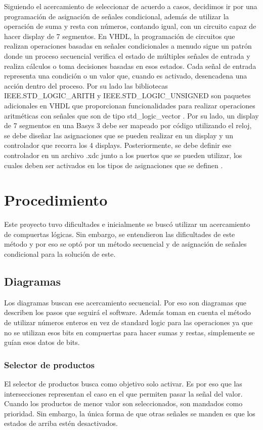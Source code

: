 \documentclass[12pt]{article}  %
\begin{document}
Siguiendo el acercamiento de seleccionar de acuerdo a casos, decidimos ir por una programación de asignación de señales condicional, además de utilizar la operación de suma y resta con números, contando igual, con un circuito capaz de hacer display de 7 segmentos. En VHDL, la programación de circuitos que realizan operaciones basadas en señales condicionales a menudo sigue un patrón donde un proceso secuencial verifica el estado de múltiples señales de entrada y realiza cálculos o toma decisiones basadas en esos estados. Cada señal de entrada representa una condición o un valor que, cuando es activado, desencadena una acción dentro del proceso. Por su lado las bibliotecas IEEE.STD\_LOGIC\_ARITH y IEEE.STD\_LOGIC\_UNSIGNED son paquetes adicionales en VHDL que proporcionan funcionalidades para realizar operaciones aritméticas con señales que son de tipo std\_logic\_vector \cite{unlp2018}. Por su lado, un display de 7 segmentos en una Basys 3 debe ser mapeado por código utilizando el reloj, se debe diseñar las asignaciones que se pueden realizar en un display y un controlador que recorra los 4 displays. Posteriormente, se debe definir ese controlador en un archivo .xdc junto a los puertos que se pueden utilizar, los cuales deben ser activados en los tipos de asignaciones que se definen \cite{digilent2023}.

\section{Procedimiento}
Este proyecto tuvo dificultades e inicialmente se buscó utilizar un acercamiento de compuertas lógicas. Sin embargo, se entendieron las dificultades de este método y por eso se optó por un método secuencial y de asignación de señales condicional para la solución de este.

\subsection{Diagramas}
Los diagramas buscan ese acercamiento secuencial. Por eso son diagramas que describen los pasos que seguirá el software. Además toman en cuenta el método de utilizar números enteros en vez de standard logic para las operaciones ya que no se utilizan esos bits en compuertas para hacer sumas y restas, simplemente se guían esos datos de bits.

\newpage

\subsubsection{Selector de productos}
El selector de productos busca como objetivo solo activar. Es por eso que las intersecciones representan el caso en el que permiten pasar la señal del valor. Cuando los productos de menor valor son seleccionados, son mandados como prioridad. Sin embargo, la única forma de que otras señales se manden es que los estados de arriba estén desactivados.
\end{document}
